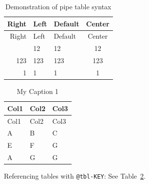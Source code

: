 \documentclass[
  11pt,
  letterpaper,
]{book}
\begin{document}
\begin{longtable}[]{@{}rllc@{}}
\caption{Demonstration of pipe table
syntax}\label{tbl-letters}\tabularnewline
\toprule\noalign{}
Right & Left & Default & Center \\
\midrule\noalign{}
\endfirsthead
\toprule\noalign{}
Right & Left & Default & Center \\
\midrule\noalign{}
\endhead
\bottomrule\noalign{}
\endlastfoot
12 & 12 & 12 & 12 \\
123 & 123 & 123 & 123 \\
1 & 1 & 1 & 1 \\
\end{longtable}

\begin{longtable}[]{@{}lll@{}}
\caption{My Caption 1}\label{tbl-letters}\tabularnewline
\toprule\noalign{}
Col1 & Col2 & Col3 \\
\midrule\noalign{}
\endfirsthead
\toprule\noalign{}
Col1 & Col2 & Col3 \\
\midrule\noalign{}
\endhead
\bottomrule\noalign{}
\endlastfoot
A & B & C \\
E & F & G \\
A & G & G \\
\end{longtable}

Referencing tables with \texttt{@tbl-KEY}: See Table~\ref{tbl-letters}.

\begin{table}

\caption{\label{tbl-panel}Main Caption}

\begin{minipage}{0.50\linewidth}



\end{minipage}%
%
\begin{minipage}{0.50\linewidth}



\end{minipage}%

\end{table}%
\end{document}
